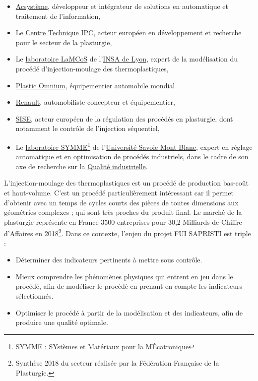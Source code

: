 \begin{itemize}
\item \href{http://www.acsysteme.com/}{Acsystème}, développeur et intégrateur de solutions en automatique et traitement de l'information,
\item Le \href{https://ct-ipc.com/}{Centre Technique IPC}, acteur européen en développement et recherche pour le secteur de la plasturgie,
\item Le \href{https://lamcos.insa-lyon.fr/}{laboratoire LaMCoS} de l'\href{https://www.insa-lyon.fr/}{INSA de Lyon}, expert de la modélisation du procédé d'injection-moulage des thermoplastiques,
\item \href{https://www.plasticomnium.com/}{Plastic Omnium}, équipementier automobile mondial
\item \href{https://www.renault.fr/}{Renault}, automobiliste concepteur et équipementier,
\item \href{http://www.sise-plastics.com/}{SISE}, acteur européen de la régulation des procédés en plasturgie, dont notamment le contrôle de l'injection séquentiel,
\item Le \href{http://www.symme.univ-smb.fr/}{laboratoire SYMME}\footnote{SYMME : SYstèmes et Matériaux pour la MÉcatronique} de l'\href{https://www.univ-smb.fr/}{Université Savoie Mont Blanc}, expert en réglage automatique et en optimisation de procédés industriels, dans le cadre de son axe de recherche sur la \href{https://symme.univ-smb.fr/axes/qualite-indusrtielle}{Qualité industrielle}.
\end{itemize}

L'injection-moulage des thermoplastiques est un procédé de production bas-coût et haut-volume.  %
C'est un procédé particulièrement intéressant car il permet d'obtenir avec un temps de cycles courts des pièces de toutes dimensions aux géométries complexes ; qui sont très proches du produit final.
Le marché de la plasturgie représente en France 3500 entreprises pour 30,2 Milliards de Chiffre d'Affaires en 2018\footnote{Synthèse 2018 du secteur réalisée par la Fédération Française de la Plasturgie.}.
Dans ce contexte, l’enjeu du projet FUI SAPRISTI est triple :
\begin{itemize}
	\item Déterminer des indicateurs pertinents à mettre sous contrôle.
	\item Mieux comprendre les phénomènes physiques qui entrent en jeu dans le procédé, afin de modéliser le procédé en prenant en compte les indicateurs sélectionnés.
	\item Optimiser le procédé à partir de la modélisation et des indicateurs, afin de produire une qualité optimale. %
\end{itemize}

